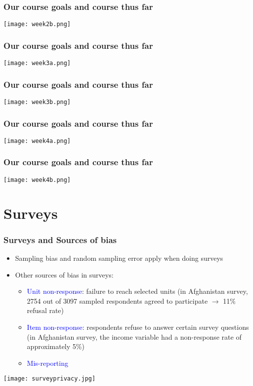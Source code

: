 \documentclass[handout]{beamer}
\newcommand{\blue}{\textcolor{blue}}
\begin{document}
\begin{frame}
 \frametitle{Our course goals and course thus far}
 \texttt{[image: week2b.png]}
\end{frame}

\begin{frame}
 \frametitle{Our course goals and course thus far}
 \texttt{[image: week3a.png]}
\end{frame}

\begin{frame}
 \frametitle{Our course goals and course thus far}
 \texttt{[image: week3b.png]}
\end{frame}

\begin{frame}
 \frametitle{Our course goals and course thus far}
 \texttt{[image: week4a.png]}
\end{frame}

\begin{frame}
 \frametitle{Our course goals and course thus far}
 \texttt{[image: week4b.png]}
\end{frame}

\section{Surveys}

\begin{frame}
 \frametitle<+->{Surveys and Sources of bias}
 \begin{minipage}{.58\linewidth}
 \begin{itemize}[<+->]
   \item Sampling bias and random sampling error apply when doing surveys
   \item Other sources of bias in surveys:
     \begin{itemize}
       \item \blue{Unit non-response}: failure to reach selected units (in Afghanistan survey, 2754 out of 3097 sampled respondents agreed to participate $\rightarrow$ 11\% refusal rate)
       \item \blue{Item non-response}:  respondents refuse to answer certain survey questions (in Afghanistan survey, the income variable had a non-response rate of approximately 5\%)
       \item \blue{Mis-reporting}
     \end{itemize}
 \end{itemize}
 \end{minipage}\hfill
 \begin{minipage}{.38\linewidth}
 \texttt{[image: surveyprivacy.jpg]}
 \end{minipage}
\end{frame}
\end{document}
